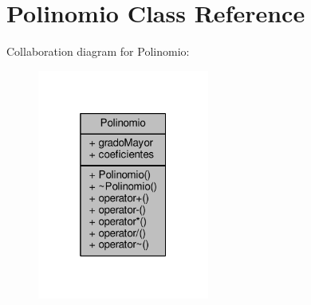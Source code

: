 \hypertarget{class_polinomio}{\section{Polinomio Class Reference}
\label{class_polinomio}
}


Collaboration diagram for Polinomio\+:
\nopagebreak
\begin{figure}[H]
\begin{center}
\leavevmode
\includegraphics[width=160pt]{class_polinomio__coll__graph}
\end{center}
\end{figure}
